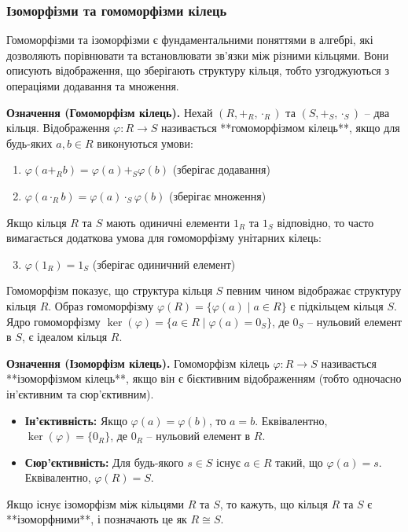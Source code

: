 \documentclass[a4paper,12pt]{article}
\begin{document}
    \subsubsection{Ізоморфізми та гомоморфізми кілець} %
    Гомоморфізми та ізоморфізми є фундаментальними поняттями в алгебрі, які дозволяють порівнювати та встановлювати зв'язки між різними кільцями. Вони описують відображення, що зберігають структуру кільця, тобто узгоджуються з операціями додавання та множення.

    \textbf{Означення (Гомоморфізм кілець).} Нехай \((R, +_R, \cdot_R)\) та \((S, +_S, \cdot_S)\) -- два кільця. Відображення \(\varphi: R \to S\) називається **гомоморфізмом кілець**, якщо для будь-яких \(a, b \in R\) виконуються умови:
    \begin{enumerate}
        \item \(\varphi(a +_R b) = \varphi(a) +_S \varphi(b)\) (зберігає додавання)
        \item \(\varphi(a \cdot_R b) = \varphi(a) \cdot_S \varphi(b)\) (зберігає множення)
    \end{enumerate}
    Якщо кільця \(R\) та \(S\) мають одиничні елементи \(1_R\) та \(1_S\) відповідно, то часто вимагається додаткова умова для гомоморфізму унітарних кілець:
    \begin{enumerate}
        \setcounter{enumi}{2}
        \item \(\varphi(1_R) = 1_S\) (зберігає одиничний елемент)
    \end{enumerate}
    Гомоморфізм показує, що структура кільця \(S\) певним чином відображає структуру кільця \(R\). Образ гомоморфізму \(\varphi(R) = \{\varphi(a) \mid a \in R\}\) є підкільцем кільця \(S\). Ядро гомоморфізму \(\ker(\varphi) = \{a \in R \mid \varphi(a) = 0_S\}\), де \(0_S\) -- нульовий елемент в \(S\), є ідеалом кільця \(R\).

    \textbf{Означення (Ізоморфізм кілець).} Гомоморфізм кілець \(\varphi: R \to S\) називається **ізоморфізмом кілець**, якщо він є бієктивним відображенням (тобто одночасно ін'єктивним та сюр'єктивним).
    \begin{itemize}
        \item \textbf{Ін'єктивність:} Якщо \(\varphi(a) = \varphi(b)\), то \(a = b\). Еквівалентно, \(\ker(\varphi) = \{0_R\}\), де \(0_R\) -- нульовий елемент в \(R\).
        \item \textbf{Сюр'єктивність:} Для будь-якого \(s \in S\) існує \(a \in R\) такий, що \(\varphi(a) = s\). Еквівалентно, \(\varphi(R) = S\).
    \end{itemize}
    Якщо існує ізоморфізм між кільцями \(R\) та \(S\), то кажуть, що кільця \(R\) та \(S\) є **ізоморфними**, і позначають це як \(R \cong S\).
\end{document}

